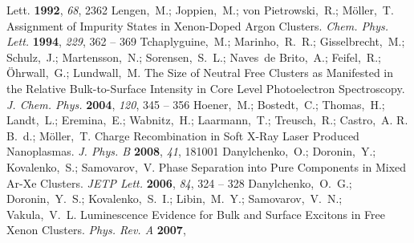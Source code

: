 \documentclass[journal=jpccck,manuscript=article]{achemso}
\begin{document}
\begin{mcitethebibliography}{73}
{  Lett.} \textbf{1992}, \emph{68}, 2362\relax
\mciteBstWouldAddEndPuncttrue
\mciteSetBstMidEndSepPunct{\mcitedefaultmidpunct}
{\mcitedefaultendpunct}{\mcitedefaultseppunct}\relax
\EndOfBibitem
{}
Lengen,~M.; Joppien,~M.; von Pietrowski,~R.; M\"oller,~T. Assignment of
  Impurity States in Xenon-Doped Argon Clusters. \emph{Chem. Phys. Lett.}
  \textbf{1994}, \emph{229}, 362 -- 369\relax
\mciteBstWouldAddEndPuncttrue
\mciteSetBstMidEndSepPunct{\mcitedefaultmidpunct}
{\mcitedefaultendpunct}{\mcitedefaultseppunct}\relax
\EndOfBibitem
{}
Tchaplyguine,~M.; Marinho,~R.~R.; Gisselbrecht,~M.; Schulz,~J.; Martensson,~N.;
  Sorensen,~S.~L.; Naves~de Brito,~A.; Feifel,~R.; \"Ohrwall,~G.; Lundwall,~M.
    The Size of Neutral Free Clusters as Manifested in the
  Relative Bulk-to-Surface Intensity in Core Level Photoelectron Spectroscopy.
  \emph{J. Chem. Phys.} \textbf{2004}, \emph{120}, 345 -- 356\relax
\mciteBstWouldAddEndPuncttrue
\mciteSetBstMidEndSepPunct{\mcitedefaultmidpunct}
{\mcitedefaultendpunct}{\mcitedefaultseppunct}\relax
\EndOfBibitem
{}
Hoener,~M.; Bostedt,~C.; Thomas,~H.; Landt,~L.; Eremina,~E.; Wabnitz,~H.;
  Laarmann,~T.; Treusch,~R.; Castro,~A. R. B.~d.; M\"oller,~T. Charge
  Recombination in Soft X-Ray Laser Produced Nanoplasmas. \emph{J. Phys. B}
  \textbf{2008}, \emph{41}, 181001\relax
\mciteBstWouldAddEndPuncttrue
\mciteSetBstMidEndSepPunct{\mcitedefaultmidpunct}
{\mcitedefaultendpunct}{\mcitedefaultseppunct}\relax
\EndOfBibitem
{}
Danylchenko,~O.; Doronin,~Y.; Kovalenko,~S.; Samovarov,~V. Phase Separation
  into Pure Components in Mixed Ar-Xe Clusters. \emph{JETP Lett.}
  \textbf{2006}, \emph{84}, 324 -- 328\relax
\mciteBstWouldAddEndPuncttrue
\mciteSetBstMidEndSepPunct{\mcitedefaultmidpunct}
{\mcitedefaultendpunct}{\mcitedefaultseppunct}\relax
\EndOfBibitem
{}
Danylchenko,~O.~G.; Doronin,~Y.~S.; Kovalenko,~S.~I.; Libin,~M.~Y.;
  Samovarov,~V.~N.; Vakula,~V.~L. Luminescence Evidence for Bulk and Surface
  Excitons in Free Xenon Clusters. \emph{Phys. Rev. A} \textbf{2007},

\end{mcitethebibliography}
\end{document}
